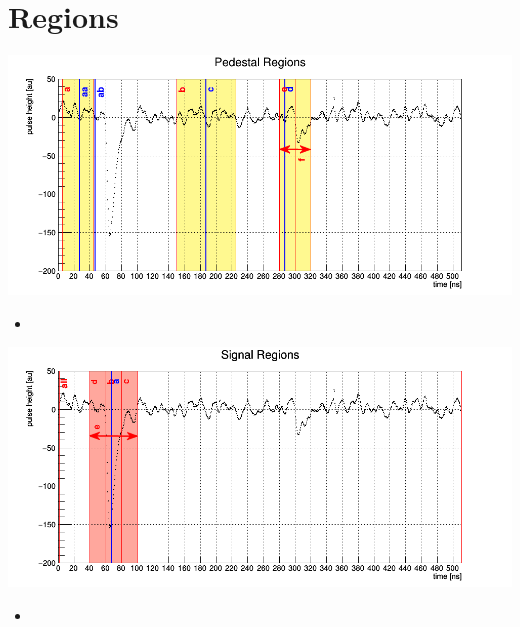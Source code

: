 \documentclass[9pt]{beamer}
\begin{document}
\section{Regions}
\begin{frame}
	\begin{center}
		\includegraphics[width=\textwidth]{Pics/PedestalRegions}
	\end{center}
	\begin{itemize}
		\item 
	\end{itemize}
\end{frame}
\begin{frame}
	\begin{center}
		\includegraphics[width=\textwidth]{Pics/SignalRegions}
	\end{center}
	\begin{itemize}
		\item 
	\end{itemize}
\end{frame}
\end{document}
